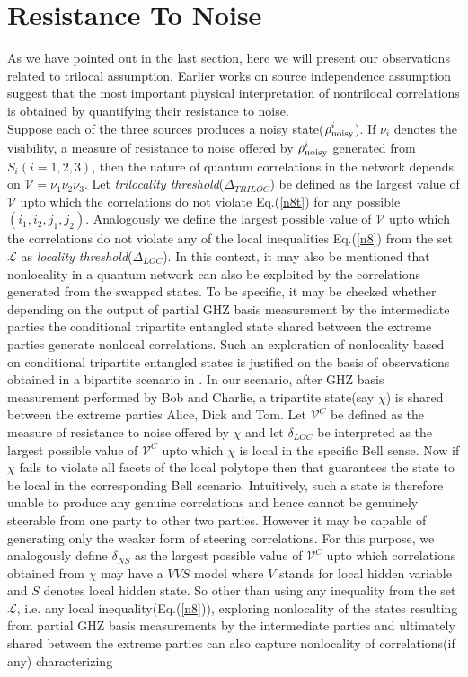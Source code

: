 \documentclass[pra,10pt,twocolumn,superscriptaddress,floatfix,showpacs]{revtex4-1}
\begin{document}
\section{Resistance To Noise}\label{res}
As we have pointed out in the last section, here we will present our observations related to trilocal assumption. Earlier works on source independence assumption\cite{BRA,BRAN} suggest that the most important physical interpretation of nontrilocal correlations is obtained by quantifying their resistance to noise.\\
Suppose each of the three sources produces a noisy state($\rho_{\textmd{noisy}}^i$). If $\nu_i$ denotes the visibility, a measure of resistance to noise offered by $\rho_{\textmd{noisy}}^i$ generated from $S_i(i=1,2,3)$, then the nature of quantum correlations in the network depends on $\mathcal{V}=\nu_1\nu_2\nu_3.$ Let \textit{trilocality threshold}($\Delta_{TRILOC}$) be defined as the largest value of $\mathcal{V}$ upto which the correlations do not violate Eq.(\ref{n8t}) for any possible $(i_1,i_2,j_1,j_2)$. Analogously we define the largest possible value of $\mathcal{V}$ upto which the correlations do not violate any of the local inequalities Eq.(\ref{n8}) from the set $\mathcal{L}$ as \textit{locality threshold}($\Delta_{LOC}$). In this context, it may also be mentioned that nonlocality in a quantum network can also be exploited by the correlations generated from the swapped states. To be specific, it may be checked whether depending on the output of partial GHZ basis measurement by the intermediate parties the conditional tripartite entangled state shared between the extreme parties generate nonlocal correlations. Such an exploration of nonlocality based on conditional tripartite entangled states is justified on the basis of observations obtained in a bipartite scenario in \cite{pircond}. In our scenario, after GHZ basis measurement performed by Bob and Charlie, a tripartite state(say $\chi$) is shared between the extreme parties Alice, Dick and Tom. Let $\mathcal{V}^C$ be defined as the  measure of resistance to noise offered by $\chi$ and let $\delta_{LOC}$ be interpreted as the largest possible value of $\mathcal{V}^C$ upto which $\chi$ is local in the specific Bell sense\cite{Sliwa}. Now if $\chi$ fails to violate all facets of the local polytope\cite{Sliwa} then that guarantees the state to be local in the corresponding Bell scenario. Intuitively, such a state is therefore unable to produce any genuine correlations and hence cannot be genuinely steerable from one party to other two parties\cite{jeva}. However it may be capable of generating only the weaker form of steering correlations\cite{caval1}. For this purpose, we analogously define $\delta_{NS}$ as the largest possible value of $\mathcal{V}^C$ upto which correlations obtained from $\chi$ may have a $VVS$ model where $V$ stands for local hidden variable and $S$ denotes local hidden state\cite{caval1}. So other than using any inequality from the set $\mathcal{L}$, i.e. any local inequality(Eq.(\ref{n8})), exploring nonlocality of the states resulting from  partial GHZ basis measurements by the intermediate parties and ultimately shared between the extreme parties can also capture nonlocality of correlations(if any) characterizing  
\end{document}

